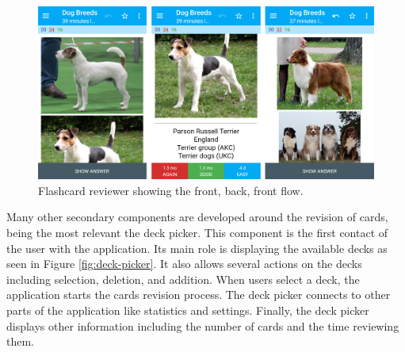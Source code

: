\begin{figure}[htb]
    \vskip 5mm
        \begin{center}
            \includegraphics[scale=0.28]{./Figures/reviewer.png}
            \caption{Flashcard reviewer showing the front, back, front flow.}
            \label{fig:front-back-assess}
        \end{center}
    \vskip -5mm
\end{figure}

Many other secondary components are developed around the revision of cards, being the most relevant the deck picker. This component is the first contact of the user with the application. Its main role is displaying the available decks as seen in Figure \ref{fig:deck-picker}. It also allows several actions on the decks including selection, deletion, and addition. When users select a deck, the application starts the cards revision process. The deck picker connects to other parts of the application like statistics and settings. Finally, the deck picker displays other information including the number of cards and the time reviewing them.

